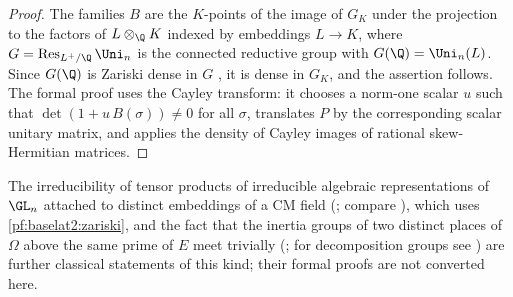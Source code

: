 \begin{proof}
The families $B$ are the $K$-points of the image of $G_K$ under the projection to the factors of
$L\otimes_\Q K$ indexed by embeddings $L\to K$, where $G=\mathrm{Res}_{L^+/\Q}\,\Uni_n$ is the connected reductive group with
$G(\Q)=\Uni_n(L)$. Since $G(\Q)$ is Zariski dense in $G$ \cite[Cor.~18.3]{Borel1991}, it is dense in $G_K$, and the
assertion follows. The formal proof uses the Cayley transform: it chooses a norm-one scalar $u$ such that
$\det(1+u\,B(\sigma))\ne0$ for all $\sigma$,
translates $P$ by the corresponding scalar unitary matrix, and applies the density of Cayley images of rational
skew-Hermitian matrices.
\end{proof}

The irreducibility of tensor products of irreducible algebraic representations of $\GL_n$ attached to distinct
embeddings of a CM field (; compare
\cite[Lectures~2 and~6]{FultonHarris1991}), which uses \cref{pf:baselat2:zariski}, and the fact that the inertia
groups of two distinct places of $\Omega$ above the same prime of $E$ meet trivially
(; for decomposition groups see
\cite[Ch.~XII, \S1]{NeukirchSchmidtWingberg2008}) are further classical statements of this kind; their formal proofs
are not converted here.

